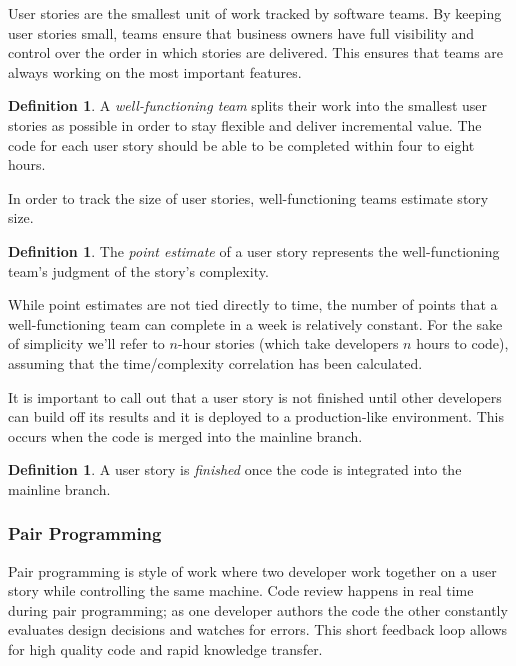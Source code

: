 \documentclass[letterpaper]{article}
\theoremstyle{definition}
\newtheorem{definition}[theorem]{Definition}
\begin{document}
    User stories are the smallest unit of work tracked by software teams.
    By keeping user stories small, teams ensure that business owners have full visibility and control over the order
    in which stories are delivered.
    This ensures that teams are always working on the most important features.

    \begin{definition}
        A \textit{well-functioning team} splits their work into the smallest user stories as possible in order to stay
        flexible and deliver incremental value.
        The code for each user story should be able to be completed within four to eight hours.
    \end{definition}

    In order to track the size of user stories, well-functioning teams estimate story size.

    \begin{definition}
        The \textit{point estimate} of a user story represents the well-functioning team's judgment of the story's
        complexity.
    \end{definition}

    While point estimates are not tied directly to time, the number of points that a well-functioning team can complete
    in a week is relatively constant.
    For the sake of simplicity we'll refer to $n$-hour stories (which take developers $n$ hours to code), assuming that
    the time/complexity correlation has been calculated.

    It is important to call out that a user story is not finished until other developers can build off its results and
    it is deployed to a production-like environment.
    This occurs when the code is merged into the mainline branch.

    \begin{definition}
        A user story is \textit{finished} once the code is integrated into the mainline branch.
    \end{definition}

    \subsubsection{Pair Programming}\label{subsubsec:pairing}

    Pair programming is style of work where two developer work together on a user story while controlling the same machine.
    Code review happens in real time during pair programming;
    as one developer authors the code the other constantly evaluates design decisions and watches for errors.
    This short feedback loop allows for high quality code and rapid knowledge transfer.
\end{document}
